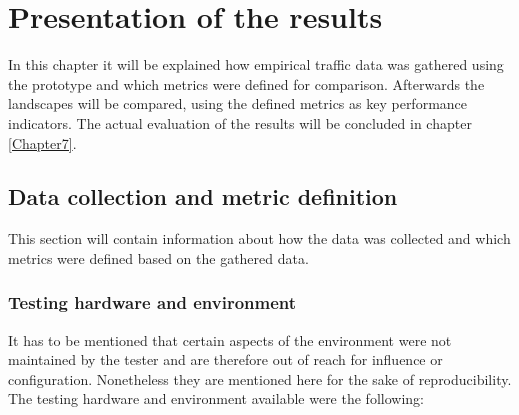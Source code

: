 \chapter{Presentation of the results} %
\label{Chapter6}


In this chapter it will be explained how empirical traffic data was gathered using the prototype and which metrics were defined for comparison.
Afterwards the landscapes will be compared, using the defined metrics as key performance indicators. The actual evaluation of the results will be concluded in chapter \ref{Chapter7}.

\section{Data collection and metric definition} 

This section will contain information about how the data was collected and which metrics were defined based on the gathered data.

\subsection{Testing hardware and environment}

It has to be mentioned that certain aspects of the environment were not maintained by the tester and are therefore out of reach for influence or configuration. Nonetheless they are mentioned here for the sake of reproducibility.
The testing hardware and environment available were the following:

